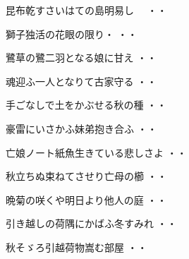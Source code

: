 \begin{shiika}昆布乾すさいはての島明易し　
\hfill{・・}\end{shiika}
\vspace{0.6cm}
\begin{shiika}獅子独活の花眼の限り・
\hfill{・・}\end{shiika}
\vspace{0.6cm}
\begin{shiika}鷺草の鷺二羽となる娘に甘え
\hfill{・・}\end{shiika}
\vspace{0.6cm}
\begin{shiika}魂迎ふ一人となりて古家守る
\hfill{・・}\end{shiika}
\vspace{0.6cm}
\begin{shiika}手ごなしで土をかぶせる秋の種
\hfill{・・}\end{shiika}
\vspace{0.6cm}
\begin{shiika}豪雷にいさかふ妹弟抱き合ふ
\hfill{・・}\end{shiika}
\vspace{0.6cm}
\begin{shiika}亡娘ノート紙魚生きている悲しさよ
\hfill{・・}\end{shiika}
\vspace{0.6cm}
\begin{shiika}秋立ちぬ束ねてさせり亡母の櫛
\hfill{・・}\end{shiika}
\vspace{0.6cm}
\begin{shiika}晩菊の咲くや明日より他人の庭
\hfill{・・}\end{shiika}
\vspace{0.6cm}
\begin{shiika}引き越しの荷隅にかばふ冬すみれ
\hfill{・・}\end{shiika}
\vspace{0.6cm}
\begin{shiika}秋そゞろ引越荷物嵩む部屋
\hfill{・・}\end{shiika}
\vspace{0.6cm}
